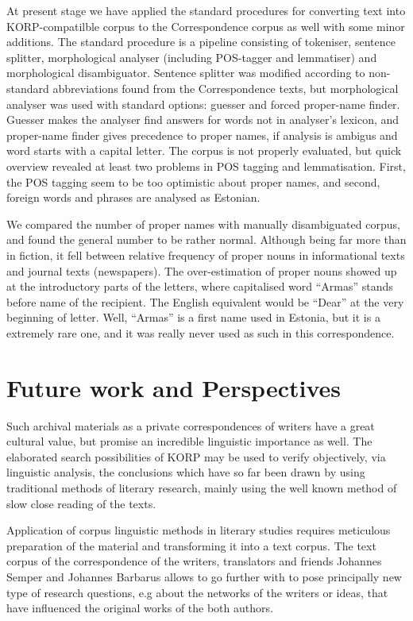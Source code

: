 \documentclass[runningheads]{llncs}
\begin{document}
At present stage we have applied the standard procedures for converting text into KORP-compatilble corpus to the Correspondence corpus as well with some minor additions.  The standard procedure is a pipeline consisting of tokeniser, sentence splitter, morphological analyser (including POS-tagger and lemmatiser) and morphological disambiguator.  Sentence splitter was modified according to non-standard abbreviations found from the Correspondence texts, but morphological analyser was used with standard options: guesser and forced proper-name finder.  Guesser makes the analyser find answers for words not in analyser's lexicon, and proper-name finder gives precedence to proper names, if analysis is ambigus and word starts with a capital letter.  The corpus is not properly evaluated, but quick overview revealed at least two problems in POS tagging and lemmatisation.  First, the POS tagging seem to be too optimistic about proper names, and second, foreign words and phrases are analysed as Estonian.

We compared the number of proper names with manually disambiguated corpus, and found the general number to be rather normal.  Although being far more than in fiction,  it fell between relative frequency of proper nouns in informational texts and journal texts (newspapers).  The over-estimation of proper nouns showed up at the introductory parts of the letters, where capitalised word ``Armas'' stands before name of the recipient.  The English equivalent would be ``Dear'' at the very beginning of letter.  Well, ``Armas'' is a first name used in Estonia, but it is a extremely rare one, and it was really never used as such in this correspondence.


\section{Future work and Perspectives}

Such archival materials as a private correspondences of writers have a great cultural value, but promise an incredible linguistic importance as well. The elaborated search possibilities of KORP may be used to verify objectively, via linguistic analysis, the conclusions which have so far been drawn by using traditional methods of literary research, mainly using the well known method of slow close reading of the texts. 

Application of corpus linguistic methods in literary studies requires meticulous preparation of the material and transforming it into a text corpus. The text corpus of the correspondence of the writers, translators and friends Johannes Semper and Johannes Barbarus allows to go further with to pose principally new type of research  questions, e.g about the networks of the writers or ideas, that have influenced  the original works of the both authors.
\end{document}
